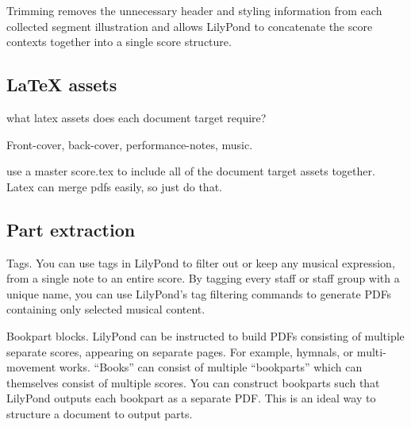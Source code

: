 Trimming removes the unnecessary header and styling information from each
collected segment illustration and allows LilyPond to concatenate the score
contexts together into a single score structure.

\begin{singlespacing}
\vspace{-0.5\baselineskip}

\end{singlespacing}

\subsection{LaTeX assets}

what latex assets does each document target require?

Front-cover, back-cover, performance-notes, music.

use a master score.tex to include all of the document target assets together.
Latex can merge pdfs easily, so just do that.

\begin{singlespacing}
\vspace{-0.5\baselineskip}

\end{singlespacing}

\subsection{Part extraction}

Tags. You can use tags in LilyPond to filter out or keep any musical
expression, from a single note to an entire score. By tagging every staff or
staff group with a unique name, you can use LilyPond's tag filtering commands
to generate PDFs containing only selected musical content.

Bookpart blocks. LilyPond can be instructed to build PDFs consisting of
multiple separate scores, appearing on separate pages. For example, hymnals, or
multi-movement works. \enquote{Books} can consist of multiple
\enquote{bookparts} which can themselves consist of multiple scores. You can
construct bookparts such that LilyPond outputs each bookpart as a separate PDF.
This is an ideal way to structure a document to output parts.

\begin{singlespacing}
\vspace{-0.5\baselineskip}

\end{singlespacing}

